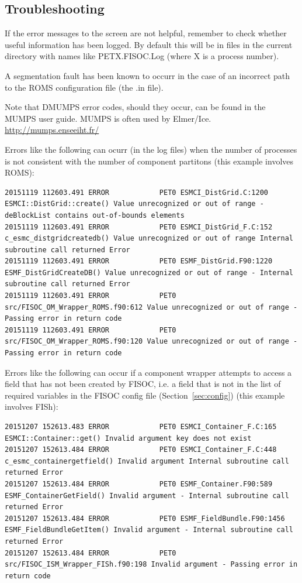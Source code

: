 \documentclass[12pt]{article}
\begin{document}
\subsection{Troubleshooting}

If the error messages to the screen are not helpful, remember to check whether useful 
information has been logged.  By default this will be in files in the current directory 
with names like PETX.FISOC.Log (where X is a process number).

A segmentation fault has been known to occurr in the case of an incorrect path to the ROMS 
configuration file (the .in file). 

Note that DMUMPS error codes, should they occur, can be found in the MUMPS user guide.
MUMPS is often used by Elmer/Ice.
\url{http://mumps.enseeiht.fr/}

Errors like the following can ocurr (in the log files) when the number of processes is 
not consistent with the number of component partitons (this example involves ROMS):
\begin{lstlisting}
20151119 112603.491 ERROR            PET0 ESMCI_DistGrid.C:1200 ESMCI::DistGrid::create() Value unrecognized or out of range - deBlockList contains out-of-bounds elements
20151119 112603.491 ERROR            PET0 ESMCI_DistGrid_F.C:152 c_esmc_distgridcreatedb() Value unrecognized or out of range Internal subroutine call returned Error
20151119 112603.491 ERROR            PET0 ESMF_DistGrid.F90:1220 ESMF_DistGridCreateDB() Value unrecognized or out of range - Internal subroutine call returned Error
20151119 112603.491 ERROR            PET0 src/FISOC_OM_Wrapper_ROMS.f90:612 Value unrecognized or out of range - Passing error in return code
20151119 112603.491 ERROR            PET0 src/FISOC_OM_Wrapper_ROMS.f90:120 Value unrecognized or out of range - Passing error in return code
\end{lstlisting}

Errors like the following can occur if a component wrapper attempts to access a field 
that has not been created by FISOC, i.e. a field that is not in the list of
required variables in the FISOC config file (Section~\ref{sec:config}) 
(this example involves FISh):
\begin{lstlisting}
20151207 152613.483 ERROR            PET0 ESMCI_Container_F.C:165 ESMCI::Container::get() Invalid argument key does not exist
20151207 152613.484 ERROR            PET0 ESMCI_Container_F.C:448 c_esmc_containergetfield() Invalid argument Internal subroutine call returned Error
20151207 152613.484 ERROR            PET0 ESMF_Container.F90:589 ESMF_ContainerGetField() Invalid argument - Internal subroutine call returned Error
20151207 152613.484 ERROR            PET0 ESMF_FieldBundle.F90:1456 ESMF_FieldBundleGetItem() Invalid argument - Internal subroutine call returned Error
20151207 152613.484 ERROR            PET0 src/FISOC_ISM_Wrapper_FISh.f90:198 Invalid argument - Passing error in return code
\end{lstlisting}
\end{document}
